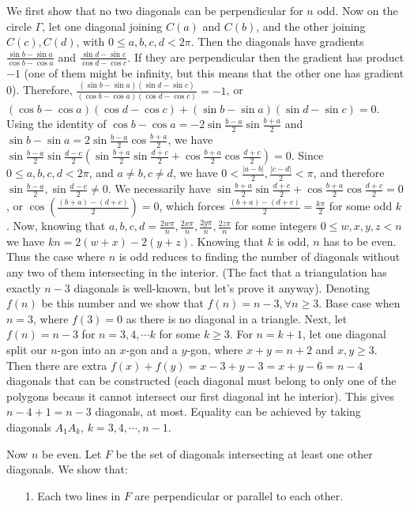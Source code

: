 \documentclass[11pt,a4paper]{article}
\begin{document}
\begin{itemize}
We first show that no two diagonals can be perpendicular for $n$ odd. 
Now on the circle $\Gamma$, let one diagonal joining $C(a)$ and $C(b)$, and the other joining $C(c), C(d)$, 
with $0\le a, b, c, d<2\pi$. 
Then the diagonals have gradients $\frac{\sin b-\sin a}{\cos b-\cos a}$ 
and $\frac{\sin d-\sin c}{\cos d-\cos c}$. 
If they are perpendicular then the gradient has product $-1$ (one of them might be infinity, but this means that the other one has gradient 0). 
Therefore, 
$\frac{(\sin b-\sin a)(\sin d-\sin c)}{(\cos b-\cos a)(\cos d-\cos c)}=-1$, or $(\cos b-\cos a)(\cos d-\cos c)+(\sin b-\sin a)(\sin d-\sin c)=0$. 
Using the identity of $\cos b-\cos a=-2\sin\frac{b-a}{2}\sin\frac{b+a}{2}$ and 
$\sin b-\sin a=2\sin\frac{b-a}{2}\cos\frac{b+a}{2}$, we have 
$\sin\frac{b-a}{2}\sin\frac{d-c}{2}(\sin\frac{b+a}{2}\sin\frac{d+c}{2}+\cos\frac{b+a}{2}\cos\frac{d+c}{2})=0$. 
Since $0\le a,b,c,d<2\pi$, and $a\neq b, c\neq d$, 
we have $0< \frac{|a-b|}2, \frac{|c-d|}2 < \pi$, and therefore 
$\sin\frac{b-a}{2}, \sin\frac{d-c}{2}\neq 0$. 
We necessarily have 
$\sin\frac{b+a}{2}\sin\frac{d+c}{2}+\cos\frac{b+a}{2}\cos\frac{d+c}{2}=0$, or 
$\cos (\frac{(b+a)-(d+c)}2)=0$, which forces 
$\frac{(b+a)-(d+c)}2=\frac{k\pi}2$ for some odd $k$. 
Now, knowing that $a, b, c, d=\frac{2w\pi}{n}, \frac{2x\pi}{n}, \frac{2y\pi}{n}, \frac{2z\pi}{n}$ for some integers $0\le w, x, y, z<n$ we have 
$kn=2(w+x)-2(y+z)$. 
Knowing that $k$ is odd, $n$ has to be even. 
Thus the case where $n$ is odd reduces to finding the number of diagonals without any two of them intersecting in the interior. 
(The fact that a triangulation has exactly $n-3$ diagonals is well-known, but let's prove it anyway). 
Denoting $f(n)$ be this number and we show that $f(n)=n-3, \forall n\ge 3$. 
Base case when $n=3$, where $f(3)=0$ as there is no diagonal in a triangle. 
Next, let $f(n)=n-3$ for $n=3, 4, \cdots k$ for some $k\ge 3$. 
For $n=k+1$, let one diagonal split our $n$-gon into an $x$-gon and a $y$-gon, where $x+y=n+2$ and $x, y\ge 3$. 
Then there are extra $f(x)+f(y)=x-3+y-3=x+y-6=n-4$ diagonals that can be constructed (each diagonal must belong to only one of the polygons becaus it cannot intersect our first diagonal int he interior). 
This gives $n-4+1=n-3$ diagonals, at most. 
Equality can be achieved by taking diagonals $A_1A_k$, $k=3, 4, \cdots , n-1$.

Now $n$ be even. Let $F$ be the set of diagonals intersecting at least one other diagonals. We show that: 
\begin{itemize}
\item [1.]
Each two lines in $F$ are perpendicular or parallel to each other. 


\end{itemize}
\end{itemize}
\end{document}
